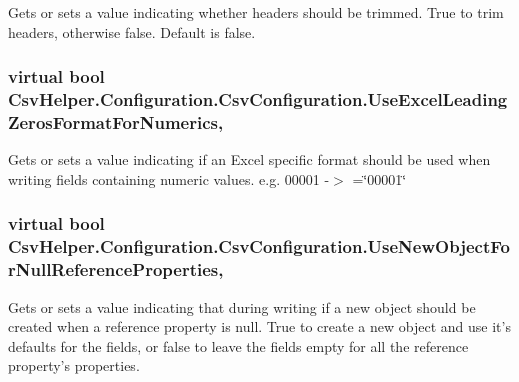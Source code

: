 Gets or sets a value indicating whether headers should be trimmed. True to trim headers, otherwise false. Default is false. 

\hypertarget{a00043_a5d2eed13b8836f0397f8c39a709de1cc}{
\subsubsection[{Use\-Excel\-Leading\-Zeros\-Format\-For\-Numerics}]{\setlength{\rightskip}{0pt plus 5cm}virtual bool Csv\-Helper.\-Configuration.\-Csv\-Configuration.\-Use\-Excel\-Leading\-Zeros\-Format\-For\-Numerics\hspace{0.3cm}{\ttfamily [get]}, {\ttfamily [set]}}}\label{a00043_a5d2eed13b8836f0397f8c39a709de1cc}


Gets or sets a value indicating if an Excel specific format should be used when writing fields containing numeric values. e.\-g. 00001 -\/$>$ =\char`\"{}00001\char`\"{} 

\hypertarget{a00043_a87c533a0dbaf65dca68233356310cab0}{
\subsubsection[{Use\-New\-Object\-For\-Null\-Reference\-Properties}]{\setlength{\rightskip}{0pt plus 5cm}virtual bool Csv\-Helper.\-Configuration.\-Csv\-Configuration.\-Use\-New\-Object\-For\-Null\-Reference\-Properties\hspace{0.3cm}{\ttfamily [get]}, {\ttfamily [set]}}}\label{a00043_a87c533a0dbaf65dca68233356310cab0}


Gets or sets a value indicating that during writing if a new object should be created when a reference property is null. True to create a new object and use it's defaults for the fields, or false to leave the fields empty for all the reference property's properties. 

